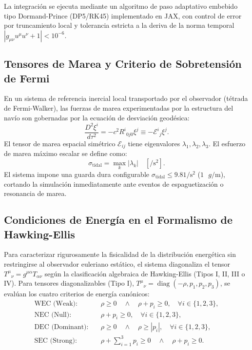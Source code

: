 \documentclass[11pt,a4paper]{article}
\begin{document}
La integración se ejecuta mediante un algoritmo de paso adaptativo embebido tipo Dormand-Prince (DP5/RK45) implementado en JAX, con control de error por truncamiento local y tolerancia estricta a la deriva de la norma temporal $|g_{\mu\nu} u^\mu u^\nu + 1| < 10^{-6}$.

\subsection{Tensores de Marea y Criterio de Sobretensión de Fermi}
En un sistema de referencia inercial local transportado por el observador (tétrada de Fermi-Walker), las fuerzas de marea experimentadas por la estructura del navío son gobernadas por la ecuación de desviación geodésica:
\begin{equation}
    \frac{D^2 \xi^i}{d\tau^2} = - c^2 R^i{}_{0 j 0} \xi^j \equiv - \mathcal{E}^i{}_j \xi^j.
\end{equation}
El tensor de marea espacial simétrico $\mathcal{E}_{ij}$ tiene eigenvalores $\lambda_1, \lambda_2, \lambda_3$. El esfuerzo de marea máximo escalar se define como:
\begin{equation}
    \sigma_{\text{tidal}} = \max_k |\lambda_k| \quad [\si{\per\second\squared}].
\end{equation}
El sistema impone una guarda dura configurable $\sigma_{\text{tidal}} \le 9.81\si{\per\second\squared}$ ($1\text{ }g/\si{\meter}$), cortando la simulación inmediatamente ante eventos de espaguetización o resonancia de marea.

\subsection{Condiciones de Energía en el Formalismo de Hawking-Ellis}
Para caracterizar rigurosamente la fisicalidad de la distribución energética sin restringirse al observador euleriano estático, el sistema diagonaliza el tensor $T^\mu{}_\nu = g^{\mu\alpha} T_{\alpha\nu}$ según la clasificación algebraica de Hawking-Ellis (Tipos I, II, III o IV). Para tensores diagonalizables (Tipo I), $T^\mu{}_\nu = \operatorname{diag}(-\rho, p_1, p_2, p_3)$, se evalúan los cuatro criterios de energía canónicos:
\begin{align}
    \text{WEC (Weak):} & \quad \rho \ge 0 \quad \land \quad \rho + p_i \ge 0, \quad \forall i \in \{1, 2, 3\}, \\
    \text{NEC (Null):} & \quad \rho + p_i \ge 0, \quad \forall i \in \{1, 2, 3\}, \\
    \text{DEC (Dominant):} & \quad \rho \ge 0 \quad \land \quad \rho \ge |p_i|, \quad \forall i \in \{1, 2, 3\}, \\
    \text{SEC (Strong):} & \quad \rho + \sum_{i=1}^3 p_i \ge 0 \quad \land \quad \rho + p_i \ge 0.
\end{align}
\end{document}
